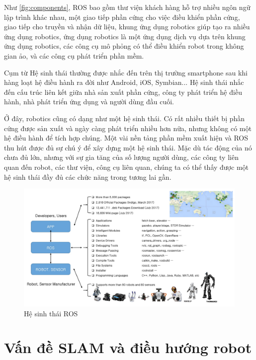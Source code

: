Như \figurename{\ref{fig:components}}, ROS bao gồm thư viện khách hàng hỗ trợ nhiều ngôn ngữ lập trình khác nhau, một giao tiếp phần cứng cho việc điều khiển phần cứng, giao tiếp cho truyền và nhận dữ liệu, khung ứng dụng robotics giúp tạo ra nhiều ứng dụng robotics, ứng dụng robotics là một ứng dụng dịch vụ dựa trên khung ứng dụng robotics, các công cụ mô phỏng có thể điều khiển robot trong không gian ảo, và các công cụ phát triển phần mềm. 

Cụm từ Hệ sinh thái thường được nhắc đến trên thị trường smartphone sau khi hàng loạt hệ điều hành ra đời như Android, iOS, Symbian... Hệ sinh thái nhắc đến cấu trúc liên kết giữa nhà sản xuất phần cứng, công ty phát triển hệ điều hành, nhà phát triển ứng dụng và người dùng đầu cuối.

Ở đây, robotics cũng có dạng như một hệ sinh thái. Có rất nhiều thiết bị phần cứng được sản xuất và ngày càng phát triển nhiều hơn nữa, nhưng không có một hệ điều hành để tích hợp chúng. Một vài nền tảng phần mềm xuất hiện và ROS thu hút được đủ sự chú ý để xây dựng một hệ sinh thái. Mặc dù tác động của nó chưa đủ lớn, nhưng với sự gia tăng của số lượng người dùng, các công ty liên quan đến robot, các thư viện, công cụ liên quan, chúng ta có thể thấy được một hệ sinh thái đầy đủ các chức năng trong tương lai gần. 
\begin{figure}[htp]
	\centering
	\includegraphics[width=1\linewidth]{chapter2/figs/Ecosystem.pdf}
	\caption{Hệ sinh thái ROS}
	\label{fig:Ecosystem}
\end{figure}
\section{Vấn đề SLAM và điều hướng robot}
